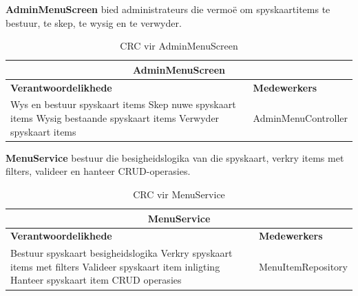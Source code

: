 \vspace{1em}
\textbf{AdminMenuScreen} bied administrateurs die vermoë om spyskaartitems te bestuur, te skep, te wysig en te verwyder.
\begin{table}[H]\centering\begin{tabular}{|p{}|p{}|}
    \hline
    \multicolumn{2}{|c|}{\textbf{AdminMenuScreen}} \\
    \hline
    \textbf{Verantwoordelikhede} & \textbf{Medewerkers} \\
    \hline
    Wys en bestuur spyskaart items \newline
    Skep nuwe spyskaart items \newline
    Wysig bestaande spyskaart items \newline
    Verwyder spyskaart items
    &
    AdminMenuController \\
    \hline
\end{tabular}
\caption{CRC vir AdminMenuScreen}
\label{tab:crc_admin_menu_screen}
\end{table}

\vspace{1em}
\textbf{MenuService} bestuur die besigheidslogika van die spyskaart, verkry items met filters, valideer en hanteer CRUD-operasies.
\begin{table}[H]\centering\begin{tabular}{|p{}|p{}|}
    \hline
    \multicolumn{2}{|c|}{\textbf{MenuService}} \\
    \hline
    \textbf{Verantwoordelikhede} & \textbf{Medewerkers} \\
    \hline
    Bestuur spyskaart besigheidslogika \newline
    Verkry spyskaart items met filters \newline
    Valideer spyskaart item inligting \newline
    Hanteer spyskaart item CRUD operasies
    &
    MenuItemRepository \\
    \hline
\end{tabular}
\caption{CRC vir MenuService}
\label{tab:crc_menu_service}
\end{table}

